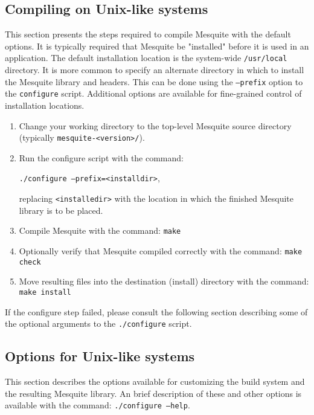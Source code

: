 \subsection{Compiling on Unix-like systems}
This section presents the steps required to compile Mesquite with the default
options.  It is typically required
that Mesquite be "installed" before it is used in an application.  The default 
installation location is the system-wide \texttt{/usr/local} directory.  
It is more common to specify an alternate directory in which to install 
the Mesquite library and headers.  This can be done using the \texttt{--prefix}
option to the \texttt{configure} script.  Additional options are available for
fine-grained control of installation locations.
\begin{enumerate}
\item Change your working directory to the top-level Mesquite source
      directory (typically \texttt{mesquite-<version>/}).
\item Run the configure script with the command: 
\begin{center}
\texttt{./configure --prefix=<installdir>},
\end{center}
      replacing \texttt{<installedir>} with the location in which the finished
      Mesquite library is to be placed.
\item Compile Mesquite with the command: \texttt{make} 
\item Optionally verify that Mesquite compiled correctly with the command: \texttt{make check}
\item Move resulting files into the destination (install) directory with the command: \texttt{make install}
\end{enumerate}
If the configure step failed, please consult the following section describing 
some of the optional arguments to the \texttt{./configure} script. 
\subsection{Options for Unix-like systems}
This section describes the options available for customizing the build
system and the resulting Mesquite library.  An brief description of these
and other options is available with the command: \texttt{./configure --help}.


